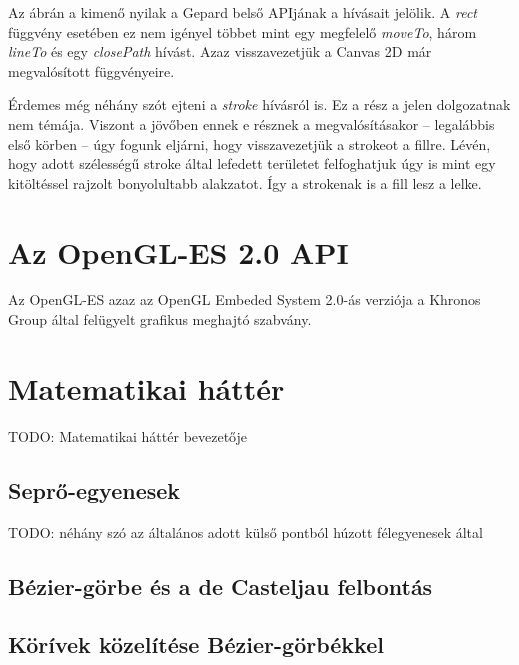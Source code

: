 \documentclass[12pt]{report}
\theoremstyle{definition}
\begin{document}
  Az ábrán a kimenő nyilak a Gepard belső APIjának a hívásait
jelölik. A \emph{rect} függvény esetében ez nem igényel többet
mint egy megfelelő \emph{moveTo}, három \emph{lineTo} és egy
\emph{closePath} hívást. Azaz visszavezetjük a Canvas 2D már
megvalósított függvényeire.

  Érdemes még néhány szót ejteni a \emph{stroke} hívásról is. Ez
a rész a jelen dolgozatnak nem témája. Viszont a jövőben ennek e
résznek a megvalósításakor -- legalábbis első körben -- úgy fogunk
eljárni, hogy visszavezetjük a strokeot a fillre. Lévén, hogy adott
szélességű stroke által lefedett területet felfoghatjuk úgy is mint egy
kitöltéssel rajzolt bonyolultabb alakzatot. Így a strokenak is a fill
lesz a lelke.

    \section[GLES2 API]{Az OpenGL-ES 2.0 API}
    \label{GLES2 API}

  Az OpenGL-ES azaz az OpenGL Embeded System 2.0-ás verziója a
Khronos Group által felügyelt grafikus meghajtó szabvány.

    \section[Matematikai háttér]{Matematikai háttér}
    \label{Matematikai háttér}

  TODO: Matematikai háttér bevezetője

    \subsection{Seprő-egyenesek}
    \label{Seprő-egyenesek}

  TODO: néhány szó az általános adott külső pontból húzott
félegyenesek által

    \subsection{Bézier-görbe és a de Casteljau felbontás}
    \label{Bézier-görbe és a de Casteljau felbontás}

    \subsection{Körívek közelítése Bézier-görbékkel}
    \label{}

\end{document}
